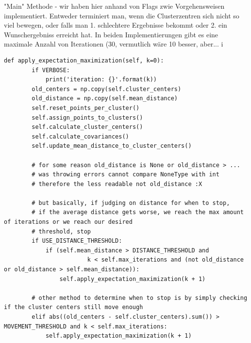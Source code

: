"Main" Methode - wir haben hier anhand von Flags zwie Vorgehensweisen implementiert. Entweder terminiert man,
wenn die Clusterzentren sich nicht so viel bewegen, oder falls man 1. schlechtere Ergebnisse bekommt oder 2.
ein Wunschergebniss erreicht hat. In beiden Implementierungen gibt es eine maximale Anzahl von Iterationen (30, vermutlich
wäre 10 besser, aber... ^^)
\begin{lstlisting}[style=py]
    def apply_expectation_maximization(self, k=0):
        if VERBOSE:
            print('iteration: {}'.format(k))
        old_centers = np.copy(self.cluster_centers)
        old_distance = np.copy(self.mean_distance)
        self.reset_points_per_cluster()
        self.assign_points_to_clusters()
        self.calculate_cluster_centers()
        self.calculate_covariances()
        self.update_mean_distance_to_cluster_centers()

        # for some reason old_distance is None or old_distance > ...
        # was throwing errors cannot compare NoneType with int
        # therefore the less readable not old_distance :X

        # but basically, if judging on distance for when to stop,
        # if the average distance gets worse, we reach the max amount of iterations or we reach our desired
        # threshold, stop
        if USE_DISTANCE_THRESHOLD:
            if (self.mean_distance > DISTANCE_THRESHOLD and
                        k < self.max_iterations and (not old_distance or old_distance > self.mean_distance)):
                self.apply_expectation_maximization(k + 1)

        # other method to determine when to stop is by simply checking if the cluster centers still move enough
        elif abs((old_centers - self.cluster_centers).sum()) > MOVEMENT_THRESHOLD and k < self.max_iterations:
            self.apply_expectation_maximization(k + 1)
\end{lstlisting}


